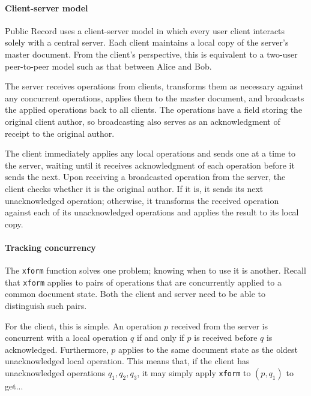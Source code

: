 \documentclass[letterpaper,11pt,twocolumn]{article}
\newcommand{\code}[1]{\texttt{\small #1}}
\begin{document}
\newcommand{\operation}{\texttt{Operation}}
\paragraph*{Client-server model}
Public Record uses a client-server model in which every user client interacts solely with a central server.  Each client maintains a local copy of the server's master document.  From the client's perspective, this is equivalent to a two-user peer-to-peer model such as that between Alice and Bob.

The server receives operations from clients, transforms them as necessary against any concurrent operations, applies them to the master document, and broadcasts the applied operations back to all clients.  The operations have a field storing the original client author, so broadcasting also serves as an acknowledgment of receipt to the original author.

The client immediately applies any local operations and sends one at a time to the server, waiting until it receives acknowledgment of each operation before it sends the next.  Upon receiving a broadcasted operation from the server, the client checks whether it is the original author.  If it is, it sends its next unacknowledged operation; otherwise, it transforms the received operation against each of its unacknowledged operations and applies the result to its local copy. 

\paragraph*{Tracking concurrency}
The \code{xform} function solves one problem; knowing when to use it is another.  Recall that \code{xform} applies to pairs of operations that are concurrently applied to a common document state.  Both the client and server need to be able to distinguish such pairs.

For the client, this is simple.  An operation $p$ received from the server is concurrent with a local operation $q$ if and only if $p$ is received before $q$ is acknowledged.  Furthermore, $p$ applies to the same document state as the oldest unacknowledged local operation.  This means that, if the client has unacknowledged operations $q_1,q_2,q_3$, it may simply apply \code{xform} to $(p,q_1)$ to get...
\end{document}
